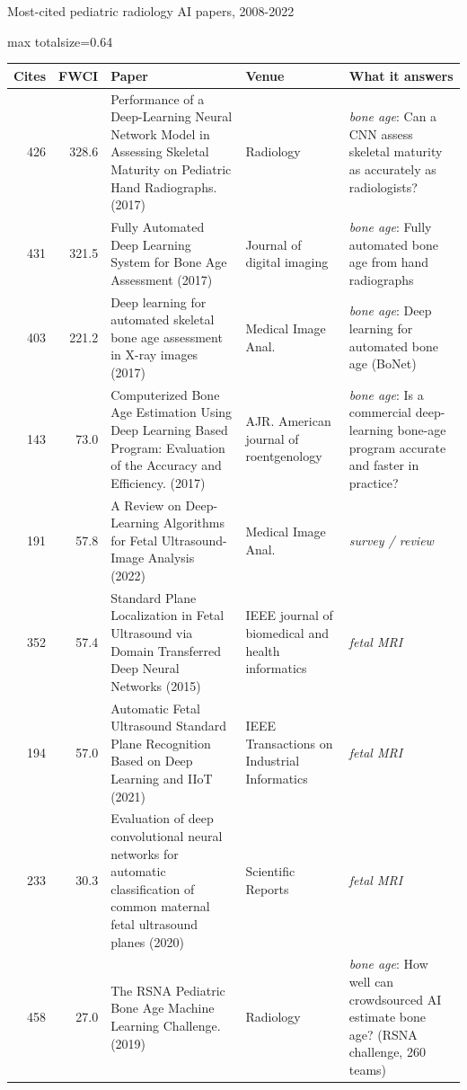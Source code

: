 \documentclass[aspectratio=169]{beamer}
\renewcommand{\arraystretch}{1.08}
\begin{document}
\begin{frame}[category=Journals/Preprints]{Most-cited pediatric radiology AI papers, 2008-2022}
\tiny
\begin{adjustbox}{max totalsize={\textwidth}{0.64\textheight}}
\renewcommand{\arraystretch}{1.2}
\begin{tabular}{|r|r|>{\raggedright\arraybackslash}p{}|>{\raggedright\arraybackslash}p{}|>{\raggedright\arraybackslash}p{}|}
\hline \textbf{Cites} & \textbf{FWCI} & \textbf{Paper} & \textbf{Venue} & \textbf{What it answers} \\ \hline
426 & 328.6 & Performance of a Deep-Learning Neural Network Model in Assessing Skeletal Maturity on Pediatric Hand Radiographs. (2017) & Radiology & \textit{bone age}: Can a CNN assess skeletal maturity as accurately as radiologists? \\ \hline
431 & 321.5 & Fully Automated Deep Learning System for Bone Age Assessment (2017) & Journal of digital imaging & \textit{bone age}: Fully automated bone age from hand radiographs \\ \hline
403 & 221.2 & Deep learning for automated skeletal bone age assessment in X-ray images (2017) & Medical Image Anal. & \textit{bone age}: Deep learning for automated bone age (BoNet) \\ \hline
143 & 73.0 & Computerized Bone Age Estimation Using Deep Learning Based Program: Evaluation of the Accuracy and Efficiency. (2017) & AJR. American journal of roentgenology & \textit{bone age}: Is a commercial deep-learning bone-age program accurate and faster in practice? \\ \hline
191 & 57.8 & A Review on Deep-Learning Algorithms for Fetal Ultrasound-Image Analysis (2022) & Medical Image Anal. & \textit{survey / review} \\ \hline
352 & 57.4 & Standard Plane Localization in Fetal Ultrasound via Domain Transferred Deep Neural Networks (2015) & IEEE journal of biomedical and health informatics & \textit{fetal MRI} \\ \hline
194 & 57.0 & Automatic Fetal Ultrasound Standard Plane Recognition Based on Deep Learning and IIoT (2021) & IEEE Transactions on Industrial Informatics & \textit{fetal MRI} \\ \hline
233 & 30.3 & Evaluation of deep convolutional neural networks for automatic classification of common maternal fetal ultrasound planes (2020) & Scientific Reports & \textit{fetal MRI} \\ \hline
458 & 27.0 & The RSNA Pediatric Bone Age Machine Learning Challenge. (2019) & Radiology & \textit{bone age}: How well can crowdsourced AI estimate bone age? (RSNA challenge, 260 teams) \\ \hline

\end{tabular}
\end{adjustbox}
\end{frame}
\end{document}
